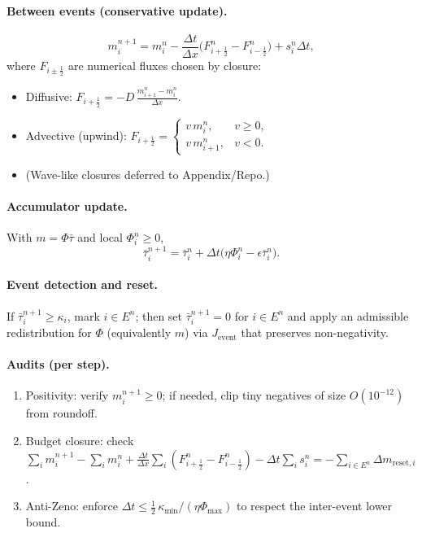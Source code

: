 \documentclass[11pt]{article}
\begin{document}
\paragraph{Between events (conservative update).}
\[
m_i^{n+1} = m_i^n - \frac{\Delta t}{\Delta x}\Big(F_{i+\frac12}^n - F_{i-\frac12}^n\Big)
           + s_i^n \Delta t,
\]
where $F_{i\pm\frac12}$ are numerical fluxes chosen by closure:
\begin{itemize}[leftmargin=*]
    \item Diffusive: $F_{i+\frac12} = -D\,\frac{m_{i+1}^n - m_i^n}{\Delta x}$.
    \item Advective (upwind): $F_{i+\frac12} = 
        \begin{cases}
          v\, m_i^n, & v\ge 0,\\
          v\, m_{i+1}^n, & v<0.
        \end{cases}$
    \item (Wave-like closures deferred to Appendix/Repo.)
\end{itemize}

\paragraph{Accumulator update.}
With $m=\Phi\bar{\tau}$ and local $\Phi_i^n \ge 0$,
\[
\bar{\tau}_i^{n+1} = \bar{\tau}_i^{n} + \Delta t\big(\eta \Phi_i^n - \epsilon \bar{\tau}_i^n\big).
\]

\paragraph{Event detection and reset.}
If $\bar{\tau}_i^{n+1} \ge \kappa_i$, mark $i\in E^n$; then set $\bar{\tau}_i^{n+1}\!=\!0$ for $i\in E^n$ and
apply an admissible redistribution for $\Phi$ (equivalently $m$) via $J_{\text{event}}$ that preserves non-negativity.

\paragraph{Audits (per step).}
\begin{enumerate}[leftmargin=*]
    \item Positivity: verify $m_i^{n+1}\ge 0$; if needed, clip tiny negatives of size $O(10^{-12})$ from roundoff.
    \item Budget closure: check 
          $\sum_i m_i^{n+1}-\sum_i m_i^n 
          + \frac{\Delta t}{\Delta x}\sum_i(F_{i+\frac12}^n-F_{i-\frac12}^n)
          - \Delta t \sum_i s_i^n
          = -\sum_{i\in E^n}\Delta m_{\text{reset},i}$.
    \item Anti-Zeno: enforce $\Delta t \le \tfrac12\,\kappa_{\min}/(\eta \Phi_{\max})$ to respect the inter-event lower bound.
\end{enumerate}
\end{document}
